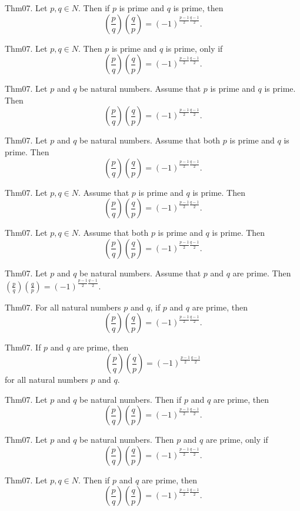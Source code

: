 \documentclass{article}
\begin{document}
Thm07. Let $p , q \in N$. Then if $p$ is prime and $q$ is prime, then $$\left(\frac{ p }{ q }\right) \left(\frac{ q }{ p }\right) = (- 1)^ {\frac{ p - 1}{2}\frac{ q - 1}{2}}.$$

Thm07. Let $p , q \in N$. Then $p$ is prime and $q$ is prime, only if $$\left(\frac{ p }{ q }\right) \left(\frac{ q }{ p }\right) = (- 1)^ {\frac{ p - 1}{2}\frac{ q - 1}{2}}.$$

Thm07. Let $p$ and $q$ be natural numbers. Assume that $p$ is prime and $q$ is prime. Then $$\left(\frac{ p }{ q }\right) \left(\frac{ q }{ p }\right) = (- 1)^ {\frac{ p - 1}{2}\frac{ q - 1}{2}}.$$

Thm07. Let $p$ and $q$ be natural numbers. Assume that both $p$ is prime and $q$ is prime. Then $$\left(\frac{ p }{ q }\right) \left(\frac{ q }{ p }\right) = (- 1)^ {\frac{ p - 1}{2}\frac{ q - 1}{2}}.$$

Thm07. Let $p , q \in N$. Assume that $p$ is prime and $q$ is prime. Then $$\left(\frac{ p }{ q }\right) \left(\frac{ q }{ p }\right) = (- 1)^ {\frac{ p - 1}{2}\frac{ q - 1}{2}}.$$

Thm07. Let $p , q \in N$. Assume that both $p$ is prime and $q$ is prime. Then $$\left(\frac{ p }{ q }\right) \left(\frac{ q }{ p }\right) = (- 1)^ {\frac{ p - 1}{2}\frac{ q - 1}{2}}.$$

Thm07. Let $p$ and $q$ be natural numbers. Assume that $p$ and $q$ are prime. Then $\left(\frac{ p }{ q }\right) \left(\frac{ q }{ p }\right) = (- 1)^ {\frac{ p - 1}{2}\frac{ q - 1}{2}}$.

Thm07. For all natural numbers $p$ and $q$, if $p$ and $q$ are prime, then $$\left(\frac{ p }{ q }\right) \left(\frac{ q }{ p }\right) = (- 1)^ {\frac{ p - 1}{2}\frac{ q - 1}{2}}.$$

Thm07. If $p$ and $q$ are prime, then $$\left(\frac{ p }{ q }\right) \left(\frac{ q }{ p }\right) = (- 1)^ {\frac{ p - 1}{2}\frac{ q - 1}{2}}$$ for all natural numbers $p$ and $q$.

Thm07. Let $p$ and $q$ be natural numbers. Then if $p$ and $q$ are prime, then $$\left(\frac{ p }{ q }\right) \left(\frac{ q }{ p }\right) = (- 1)^ {\frac{ p - 1}{2}\frac{ q - 1}{2}}.$$

Thm07. Let $p$ and $q$ be natural numbers. Then $p$ and $q$ are prime, only if $$\left(\frac{ p }{ q }\right) \left(\frac{ q }{ p }\right) = (- 1)^ {\frac{ p - 1}{2}\frac{ q - 1}{2}}.$$

Thm07. Let $p , q \in N$. Then if $p$ and $q$ are prime, then $$\left(\frac{ p }{ q }\right) \left(\frac{ q }{ p }\right) = (- 1)^ {\frac{ p - 1}{2}\frac{ q - 1}{2}}.$$
\end{document}
